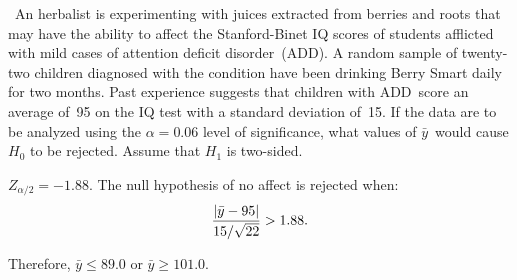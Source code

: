 \begin{problem}
  ~An herbalist is experimenting with juices extracted from berries and roots that may have the ability to affect the Stanford-Binet IQ scores of students afflicted with mild cases of attention deficit disorder~(ADD).  A random sample of twenty-two children diagnosed with the condition have been drinking Berry Smart daily for two months. Past experience suggests that children with ADD~score an average of~95 on the IQ test with a standard deviation of~15. If the data are to be analyzed using the ${\alpha =0.06}$ level of significance, what values of ${\bar{y}}$~would cause ${H_0}$ to be rejected.  Assume that $H_1$ is two-sided.
\end{problem}

\noindent
${Z_{\alpha / 2} = -1.88}$. The null hypothesis of no affect is rejected when:
\begin{equation*}
  \frac{\lvert\bar{y} - 95\rvert}{15 / \sqrt{22}} > 1.88\text{.}
\end{equation*}

Therefore, ${\bar{y} \leq 89.0}$ or ${\bar{y} \geq 101.0}$.
